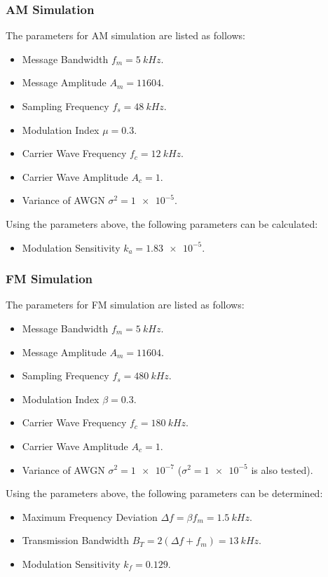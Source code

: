 \documentclass[../ECE459FinalProjectReport.tex]{subfiles}
\begin{document}
\subsubsection{AM Simulation}
The parameters for AM simulation are listed as follows:
\begin{itemize}
    \item Message Bandwidth $f_m = \SI{5}{kHz}$.
    \item Message Amplitude $A_m=11604$.
    \item Sampling Frequency $f_s = \SI{48}{kHz}$.
    \item Modulation Index $\mu = 0.3$.
    \item Carrier Wave Frequency $f_c = \SI{12}{kHz}$.
    \item Carrier Wave Amplitude $A_c = 1$.
    \item Variance of AWGN $\sigma^2 = \num{1e-5}$.
\end{itemize}
Using the parameters above, the following parameters can be calculated:
\begin{itemize}
    \item Modulation Sensitivity $k_a = \num{1.83e-5}$.
\end{itemize}

\subsubsection{FM Simulation}
The parameters for FM simulation are listed as follows:
\begin{itemize}
    \item Message Bandwidth $f_m = \SI{5}{kHz}$.
    \item Message Amplitude $A_m=11604$.
    \item Sampling Frequency $f_s = \SI{480}{kHz}$.
    \item Modulation Index $\beta=0.3$.
    \item Carrier Wave Frequency $f_c = \SI{180}{kHz}$.
    \item Carrier Wave Amplitude $A_c = 1$.
    \item Variance of AWGN $\sigma^2 = \num{1e-7}$ ($\sigma^2=\num{1e-5}$ is also tested).
\end{itemize}
Using the parameters above, the following parameters can be determined:
\begin{itemize}
    \item Maximum Frequency Deviation $\Delta f=\beta f_m = \SI{1.5}{kHz}$.
    \item Transmission Bandwidth $B_T = 2\left( \Delta f + f_m\right) = \SI{13}{kHz}$.
    \item Modulation Sensitivity $k_f = 0.129$.
\end{itemize}
\end{document}
